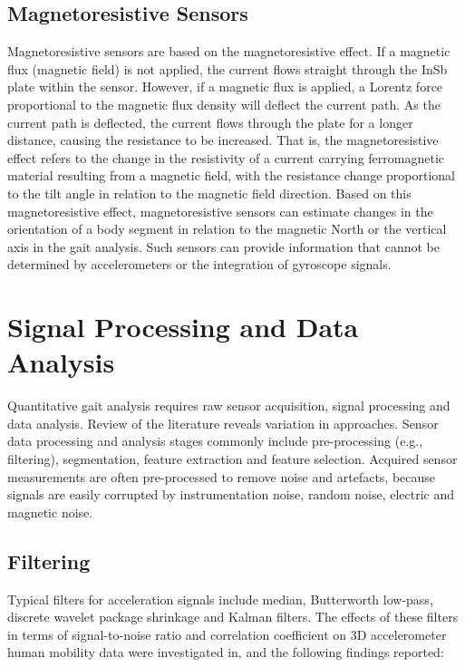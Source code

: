 \documentclass[11pt, oneside]{report}   	%
\begin{document}
\subsection{Magnetoresistive Sensors}

Magnetoresistive sensors are based on the magnetoresistive effect\cite{Tao2012}. If a magnetic flux (magnetic field) is not applied, the current flows straight through the InSb plate within the sensor. However, if a magnetic flux is applied, a Lorentz force proportional to the magnetic flux density will deflect the current path. As the current path is deflected, the current flows through the plate for a longer distance, causing the resistance to be increased\cite{Tao2012}. That is, the magnetoresistive effect refers to the change in the resistivity of a current carrying ferromagnetic material resulting from a magnetic field, with the resistance change proportional to the tilt angle in relation to the magnetic field direction\cite{Graham2004}. Based on this magnetoresistive effect, magnetoresistive sensors can estimate changes in the orientation of a body segment in relation to the magnetic North or the vertical axis in the gait analysis\cite{Choi2008}. Such sensors can provide information that cannot be determined by accelerometers or the integration of gyroscope signals\cite{Tao2012}.

\section{Signal Processing and Data Analysis}

Quantitative gait analysis requires raw sensor acquisition, signal processing and data analysis. Review of the literature reveals variation in approaches. Sensor data processing and analysis stages commonly include pre-processing (e.g., filtering), segmentation, feature extraction and feature selection\cite{Khusainov2013}. Acquired sensor measurements are often pre-processed to remove noise and artefacts, because signals are easily corrupted by instrumentation noise, random noise, electric and magnetic noise\cite{Khusainov2013}.

\subsection{Filtering}

Typical filters for acceleration signals include median, Butterworth low-pass, discrete wavelet package shrinkage and Kalman filters\cite{Wang2011}. The effects of these filters in terms of signal-to-noise ratio and correlation coefficient on 3D accelerometer human mobility data were investigated in\cite{Wang2011}, and the following findings reported:
\end{document}
